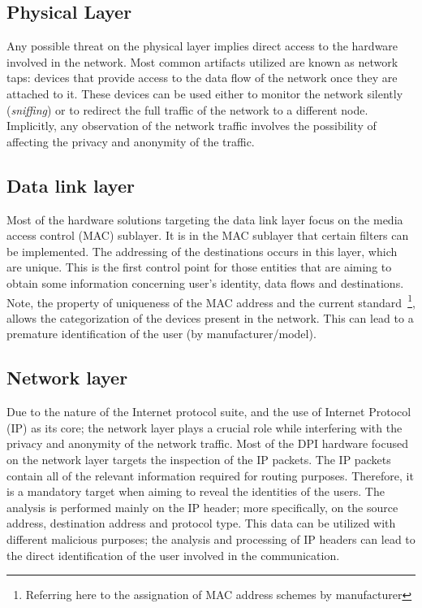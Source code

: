 \documentclass[conference]{IEEEtran}
\begin{document}
\subsection{Physical Layer}

Any possible threat on the physical layer implies direct access to the
hardware involved in the network. Most common artifacts utilized are
known as network taps: devices that provide access to the data flow of
the network once they are attached to it. These devices can be used
either to monitor the network silently (\textit{sniffing}) or to
redirect the full traffic of the network to a different
node. Implicitly, any observation of the network traffic involves the
possibility of affecting the privacy and anonymity of the traffic.

\subsection{Data link layer}

Most of the hardware solutions targeting the data link layer focus on
the media access control (MAC) sublayer. It is in the MAC sublayer
that certain filters can be implemented. The addressing of the
destinations occurs in this layer, which are unique. This is the
first control point for those entities that are aiming to obtain some
information concerning user's identity, data flows and destinations. Note,
the property of uniqueness of the MAC address and the current
standard~\footnote{Referring here to the assignation of MAC address
  schemes by manufacturer}, allows the categorization of the devices
present in the network. This can lead to a premature identification of
the user (by manufacturer/model).

\subsection{Network layer}

Due to the nature of the Internet protocol suite, and the use of Internet Protocol (IP)
as its core; the network layer plays a crucial role while interfering
with the privacy and anonymity of the network traffic. Most of the DPI
hardware focused on the network layer targets the inspection of the
IP packets. The IP packets contain all of the relevant information
required for routing purposes. Therefore, it is a mandatory target
when aiming to reveal the identities of the users. The analysis is
performed mainly on the IP header; more specifically, on the source
address, destination address and protocol type. This data can be
utilized with different malicious purposes; the analysis and
processing of IP headers can lead to the direct identification of the
user involved in the communication. 
\end{document}
